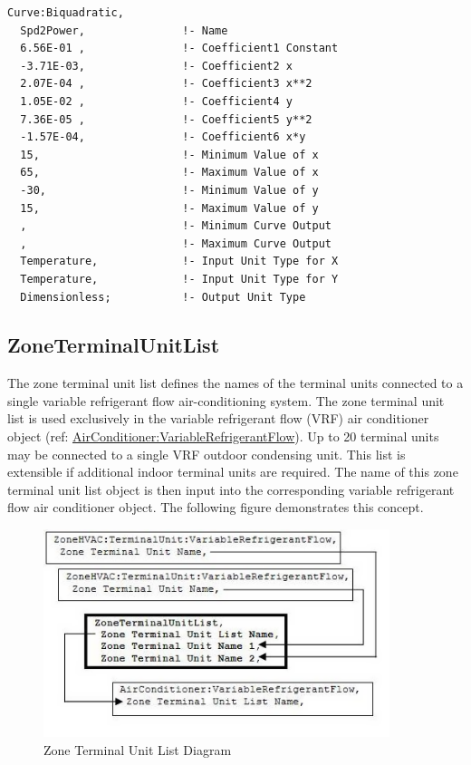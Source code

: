 \begin{lstlisting}
Curve:Biquadratic,
  Spd2Power,               !- Name
  6.56E-01 ,               !- Coefficient1 Constant
  -3.71E-03,               !- Coefficient2 x
  2.07E-04 ,               !- Coefficient3 x**2
  1.05E-02 ,               !- Coefficient4 y
  7.36E-05 ,               !- Coefficient5 y**2
  -1.57E-04,               !- Coefficient6 x*y
  15,                      !- Minimum Value of x
  65,                      !- Maximum Value of x
  -30,                     !- Minimum Value of y
  15,                      !- Maximum Value of y
  ,                        !- Minimum Curve Output
  ,                        !- Maximum Curve Output
  Temperature,             !- Input Unit Type for X
  Temperature,             !- Input Unit Type for Y
  Dimensionless;           !- Output Unit Type
\end{lstlisting}

\subsection{ZoneTerminalUnitList}\label{zoneterminalunitlist}

The zone terminal unit list defines the names of the terminal units connected to a single variable refrigerant flow air-conditioning system. The zone terminal unit list is used exclusively in the variable refrigerant flow (VRF) air conditioner object (ref: \hyperref[airconditionervariablerefrigerantflow]{AirConditioner:VariableRefrigerantFlow}). Up to 20 terminal units may be connected to a single VRF outdoor condensing unit. This list is extensible if additional indoor terminal units are required. The name of this zone terminal unit list object is then input into the corresponding variable refrigerant flow air conditioner object. The following figure demonstrates this concept.

\begin{figure}[hbtp] %
\centering
\includegraphics[width=0.9\textwidth, height=0.9\textheight, keepaspectratio=true]{media/image313.png}
\caption{Zone Terminal Unit List Diagram \protect \label{fig:zone-terminal-unit-list-diagram}}
\end{figure}

